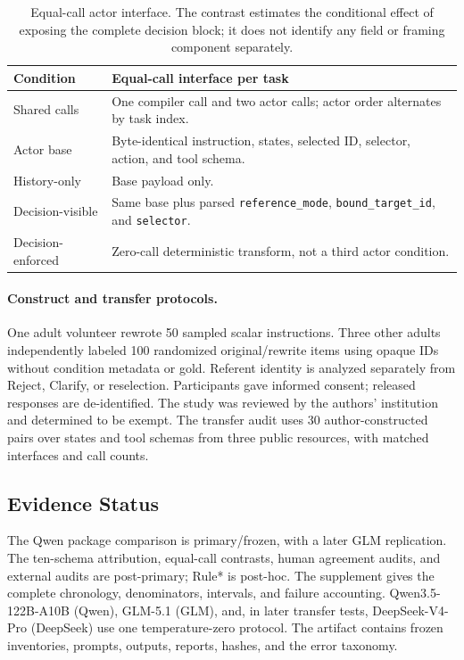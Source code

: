 \documentclass[letterpaper]{article}
\begin{document}
\begin{table}[t]
\centering
\footnotesize
\setlength{\tabcolsep}{3pt}
\begin{tabular}{@{}p{}p{}@{}}
\toprule
Condition & Equal-call interface per task \\
\midrule
Shared calls & One compiler call and two actor calls; actor order alternates by task index. \\
Actor base & Byte-identical instruction, states, selected ID, selector, action, and tool schema. \\
History-only & Base payload only. \\
Decision-visible & Same base plus parsed \texttt{reference\_mode}, \texttt{bound\_target\_id}, and \texttt{selector}. \\
Decision-enforced & Zero-call deterministic transform, not a third actor condition. \\
\bottomrule
\end{tabular}
\caption{Equal-call actor interface. The contrast estimates the conditional effect of exposing the
complete decision block; it does not identify any field or framing component separately.}
\label{tab:equal-call-interface}
\end{table}

\paragraph{Construct and transfer protocols.}
One adult volunteer rewrote 50 sampled scalar instructions. Three other adults independently
labeled 100 randomized original/rewrite items using opaque IDs without condition metadata or gold.
Referent identity is analyzed separately from Reject, Clarify, or reselection. Participants gave
informed consent; released responses are de-identified. The study was reviewed by the authors'
institution and determined to be exempt. The transfer audit uses 30 author-constructed pairs over states and tool
schemas from three public resources, with matched interfaces and call counts.

\subsection{Evidence Status}
The Qwen package comparison is primary/frozen, with a later GLM replication. The ten-schema
attribution, equal-call contrasts, human agreement audits, and external audits are post-primary;
Rule* is post-hoc. The supplement gives the complete chronology, denominators, intervals, and
failure accounting. Qwen3.5-122B-A10B (Qwen), GLM-5.1 (GLM), and, in later transfer tests,
DeepSeek-V4-Pro (DeepSeek) use one temperature-zero protocol. The artifact contains frozen
inventories, prompts, outputs, reports, hashes, and the error taxonomy.
\end{document}
